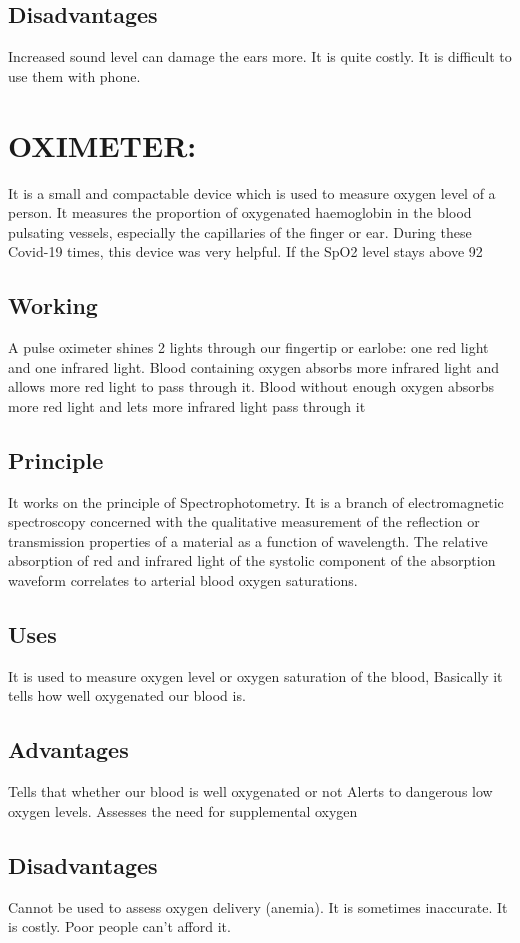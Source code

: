 \documentclass[12pt]{article}
\begin{document}
\subsection{Disadvantages}
Increased sound level can damage the ears more.
It is quite costly.
It is difficult to use them with phone.


\section{OXIMETER:}

It is a small and compactable device which is used to measure oxygen level of a person. It measures the proportion of oxygenated haemoglobin in the blood pulsating vessels, especially the capillaries of the finger or ear. During these Covid-19 times, this device was very helpful.  If the SpO2 level stays above 92%




\subsection{Working}
A pulse oximeter shines 2 lights through our fingertip or earlobe: one red light and one infrared light. Blood containing oxygen absorbs more infrared light and allows more red light to pass through it. Blood without enough oxygen absorbs more red light and lets more infrared light pass through it

\subsection{Principle}
It works on the principle of Spectrophotometry. It is a branch of electromagnetic spectroscopy concerned with the qualitative measurement of the reflection or transmission properties of a material as a function of wavelength. The relative absorption of red and infrared light of the systolic component of the absorption waveform correlates to arterial blood oxygen saturations.


\subsection{Uses}
It is used to measure oxygen level or oxygen saturation of the blood, Basically it tells how well oxygenated our blood is.



\subsection{Advantages}

Tells that whether our blood is well oxygenated or not
Alerts to dangerous low oxygen levels.
Assesses the need for supplemental oxygen

\subsection{Disadvantages}
Cannot be used to assess oxygen delivery (anemia).
It is sometimes inaccurate.
It is costly. Poor people can’t afford it.
\end{document}
